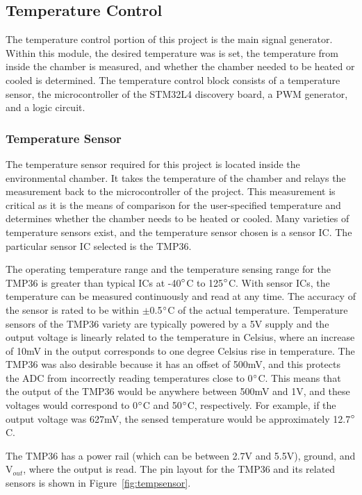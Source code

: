 \documentclass[11pt,letter]{article}
\begin{document}
\subsection{Temperature Control}

The temperature control portion of this project is the main signal generator. Within this module, the desired temperature was is set, the temperature from inside the chamber is measured, and whether the chamber needed to be heated or cooled is determined. The temperature control block consists of a temperature sensor, the microcontroller of the STM32L4 discovery board, a PWM generator, and a logic circuit.

\subsubsection{Temperature Sensor}

The temperature sensor required for this project is located inside the environmental chamber. It takes the temperature of the chamber and relays the measurement back to the microcontroller of the project. This measurement is critical as it is the means of comparison for the user-specified temperature and determines whether the chamber needs to be heated or cooled. Many varieties of temperature sensors exist, and the temperature sensor chosen is a sensor IC. The particular sensor IC selected is the TMP36. 

The operating temperature range and the temperature sensing range for the TMP36 is greater than typical ICs at -40$\degree$C to 125$\degree$C. With sensor ICs, the temperature can be measured continuously and read at any time. The accuracy of the sensor is rated to be within $\pm$0.5$\degree$C of the actual temperature. Temperature sensors of the TMP36 variety are typically powered by a 5V supply and the output voltage is linearly related to the temperature in Celsius, where an increase of 10mV in the output corresponds to one degree Celsius rise in temperature. The TMP36 was also desirable because it has an offset of 500mV, and this protects the ADC from incorrectly reading temperatures close to 0$\degree$C. This means that the output of the TMP36 would be anywhere between 500mV and 1V, and these voltages would correspond to 0$\degree$C and 50$\degree$C, respectively. For example, if the output voltage was 627mV, the sensed temperature would be approximately 12.7$\degree$C.

The TMP36 has a power rail (which can be between 2.7V and 5.5V), ground, and V$_{out}$, where the output is read. The pin layout for the TMP36 and its related sensors is shown in Figure~\ref{fig:tempsensor}.
\end{document}
